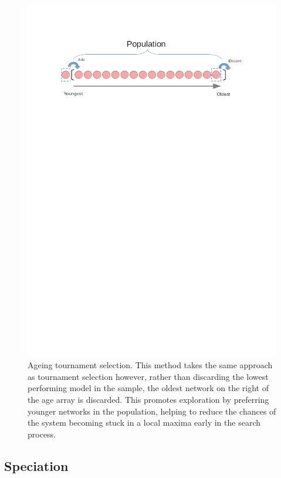 	\begin{figure}[h]
	
		\centering 
		\includegraphics[trim= 100 750 100 0 ,scale=0.35]{aging.png}


		\caption{Ageing tournament selection. This method takes the same approach as tournament selection however, rather than discarding the lowest performing model in the sample, the oldest network on the right of the age array is discarded. This promotes exploration by preferring younger networks in the population, helping to reduce the chances of the system becoming stuck in a local maxima early in the search process. }
		\label{fig:GA2}


	\end{figure}

\newpage
	\subsection{Speciation}

